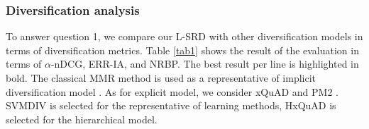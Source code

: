 \documentclass[review]{elsarticle}
\begin{document}
%

\subsubsection{Diversification analysis}\label{diver_com}
To answer question 1, we compare our L-SRD with other diversification models in terms of diversification metrics. Table \ref{tab1} shows the result of the evaluation in terms of $\alpha$-nDCG, ERR-IA, and NRBP. The best result per line is highlighted in bold. The classical MMR method is used as a representative of implicit diversification model \cite{carbonell1998use}. As for explicit model, we consider xQuAD and PM2 \cite{santos2010exploiting,dang2012diversity}. SVMDIV is selected for the representative of learning methods, HxQuAD is selected for the hierarchical model.
\end{document}
